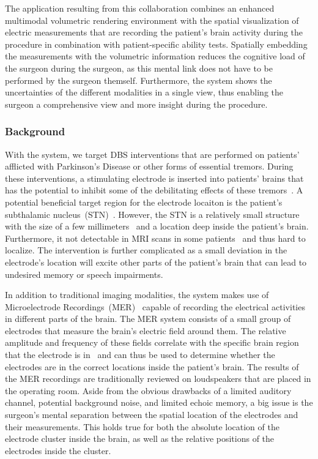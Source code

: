 The application resulting from this collaboration combines an enhanced multimodal  volumetric rendering environment with the spatial visualization of electric measurements that are recording the patient's brain activity during the procedure in combination with patient-specific ability tests. Spatially embedding the measurements with the volumetric information reduces the cognitive load of the surgeon during the surgeon, as this mental link does not have to be performed by the surgeon themself. Furthermore, the system shows the uncertainties of the different modalities in a single view, thus enabling the surgeon a comprehensive view and  more insight during the procedure.

\subsubsection{Background}
\label{contributions:medbio:dbs:background}
With the system, we target DBS interventions that are performed on patients' afflicted with Parkinson's Disease or other forms of essential tremors. During these interventions, a stimulating electrode is inserted into patients' brains that has the potential to inhibit some of the debilitating effects of these tremors~\cite{Lindberg2002}. A potential beneficial target region for the electrode locaiton is the patient's subthalamic nucleus~(STN)~\cite{Benabid2009}. However, the STN is a relatively small structure with the size of a few millimeters~\cite{Richter2004} and a location deep inside the patient's brain. Furthermore, it not detectable in MRI scans in some patients~\cite{Starr2002} and thus hard to localize. The intervention is further complicated as a small deviation in the electrode's location will excite other parts of the patient's brain that can lead to undesired memory or speech impairments.

In addition to traditional imaging modalities, the system makes use of Microelectrode Recordings~(MER)~\cite{Lenz1988} capable of recording the electrical activities in different parts of the brain. The MER system consists of a small group of electrodes that measure the brain's electric field around them. The relative amplitude and frequency of these fields correlate with the specific brain region that the electrode is in~\cite{benazzouz2002intraoperative} and can thus be used to determine whether the electrodes are in the correct locations inside the patient's brain. The results of the MER recordings are traditionally reviewed on loudspeakers that are placed in the operating room. Aside from the obvious drawbacks of a limited auditory channel, potential background noise, and limited echoic memory, a big issue is the surgeon's mental separation between the spatial location of the electrodes and their measurements. This holds true for both the absolute location of the electrode cluster inside the brain, as well as the relative positions of the electrodes inside the cluster.


